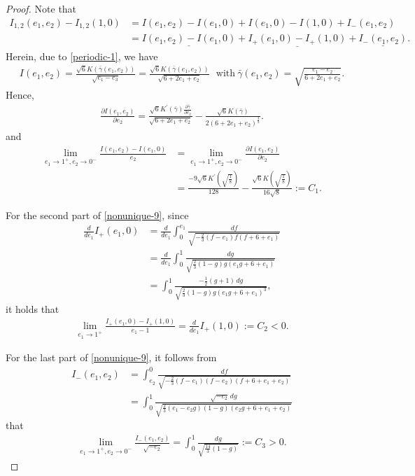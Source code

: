 \documentclass[reqno,12pt]{amsart}
\begin{document}
\begin{proof}
    Note that \begin{align}
        I_{1,2}(e_1, e_2) - I_{1, 2}(1, 0) &= I(e_1, e_2) - I(e_1, 0) + I(e_1, 0) - I(1, 0) + I_{-}(e_1, e_2) \nonumber \\  
        &= \underline{ I(e_1, e_2) - I(e_1, 0) }+ \underline{I_{+}(e_1, 0) - I_{+}(1, 0)} + \underline{ I_{-}(e_1, e_2)}. \label{nonunique-9}
    \end{align}
Herein, due to \eqref{periodic-1}, we have
\begin{align*}
    I (e_1, e_2) = \frac{\sqrt{6} K ( \bar{\gamma} (e_1, e_2))}{\sqrt{e_1 - e_3}} = \frac{\sqrt{6} K ( \bar{\gamma} (e_1, e_2))}{\sqrt{6+ 2e_1 +e_2}}\ \ \ \mbox{with}\  \bar{\gamma}(e_1, e_2) = 
    \sqrt{\frac{e_1-e_2}{6+2e_1 +e_2}}.
\end{align*}
Hence, 
    \begin{align*}
        \frac{\partial I(e_1, e_2)}{\partial e_2} =
        \frac{\sqrt{6}K^\prime ( \bar{\gamma}) \frac{\partial  \bar{\gamma}}{\partial e_2}}{\sqrt{6+ 2e_1 + e_2}}- \frac{ \sqrt{6} K ( \bar{\gamma}) }{2(6+2e_1 +e_2)^{\frac32}}.
    \end{align*}
    and 
\begin{align}
    \lim_{e_1 \to 1^+, e_2 \to 0^-} \frac{I (e_1, e_2) - I (e_1, 0)}{e_2} & =  \lim_{e_1 \to 1^+, e_2 \to 0^-} \frac{\partial I (e_1, e_2)}{\partial e_2} \nonumber \\
    &= \frac{-9\sqrt{6}K^\prime (\sqrt{\frac{1}{8}})}{128}-\frac{\sqrt{6}K(\sqrt{\frac18})}{16\sqrt{8}}:=C_1. \label{nonunique-10}
\end{align}

For the second part of \eqref{nonunique-9}, since
\begin{align*}
    \frac{d}{de_1} I_{+}(e_1, 0) & =\frac{d}{de_1} \int_0^{e_1} 
    \frac{df}{\sqrt{-\frac23(f-e_1)f(f+6+e_1 )}}  \\
    & = \frac{d}{de_1} \int_0^1 \frac{dg}{\sqrt{\frac23 (1-g)g(e_1 g+6+e_1)}} \\
    &= \int_0^1 \frac{-\frac12 (g+1)\, dg}{\sqrt{\frac23 (1-g)g (e_1 g + 6+ e_1)^3}}, 
\end{align*}
it holds that
 \begin{align}
    \lim_{e_1\to 1^+} \frac{I_{+} (e_1, 0) - I_{+}(1, 0)}{e_1 -1} = \frac{d}{de_1}I_{+}(1, 0) :=C_2 <0.  
 \end{align} 

For the last part of \eqref{nonunique-9}, it follows from
\begin{align*}
    I_{-}(e_1, e_2)& =\int_{e_2}^0 \frac{df}{\sqrt{-\frac23(f-e_1)(f-e_2)(f+6+e_1 +e_2)}} \\ & = \int_0^1 \frac{\sqrt{-e_2} \, dg}{\sqrt{\frac23 (e_1 -e_2g)(1-g) (e_2 g + 6+e_1 +e_2)}}
\end{align*}
that 
\begin{align}\label{nonunique-14}
    \lim_{e_1\to 1^+, e_2\to 0^-}\frac{I_{-}(e_1, e_2)}{\sqrt{-e_2}}
    =\int_0^1 \frac{dg}{\sqrt{\frac{14}{3} (1-g)}}:=C_3 >0. 
\end{align}


\end{proof}
\end{document}
